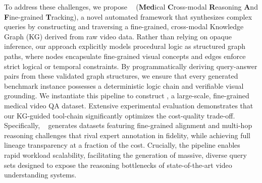 To address these challenges, we propose \textbf{\PipelineName~} (\textbf{Med}ical \textbf{C}ross-modal \textbf{R}easoning \textbf{A}nd \textbf{F}ine-grained \textbf{T}racking), a novel automated framework that synthesizes complex queries by constructing and traversing a fine-grained, cross-modal Knowledge Graph (KG) derived from raw video data.
Rather than relying on opaque inference, our approach explicitly models procedural logic as structured graph paths, where nodes encapsulate fine-grained visual concepts and edges enforce strict logical or temporal constraints.
By programmatically deriving query-answer pairs from these validated graph structures, we ensure that every generated benchmark instance possesses a deterministic logic chain and verifiable visual grounding.
We instantiate this pipeline to construct \BenchmarkName, a large-scale, fine-grained medical video QA dataset.
Extensive experimental evaluation demonstrates that our KG-guided tool-chain significantly optimizes the cost-quality trade-off.
Specifically, \PipelineName~ generates datasets featuring fine-grained alignment and multi-hop reasoning challenges that rival expert annotation in fidelity, while achieving full lineage transparency at a fraction of the cost.
Crucially, the pipeline enables rapid workload scalability, facilitating the generation of massive, diverse query sets designed to expose the reasoning bottlenecks of state-of-the-art video understanding systems.
